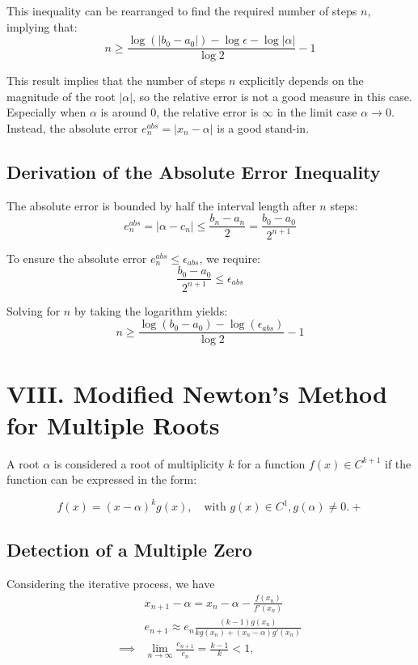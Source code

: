 \documentclass[a4paper]{article}
\begin{document}
This inequality can be rearranged to find the required number of steps $n$, implying that:
\[
n \geq \frac{\log(|b_0 - a_0|) - \log \epsilon - \log |\alpha|}{\log 2} - 1
\]

This result implies that the number of steps $n$ explicitly depends on the magnitude of the root $|\alpha|$, so the relative error is not a good measure in this case.
Especially when $\alpha$ is around $0$, the relative error is $\infty$ in the limit case $\alpha \to 0$.
Instead, the absolute error $e^{abs}_n = |x_n - \alpha|$ is a good stand-in.

\subsection*{Derivation of the Absolute Error Inequality}

The absolute error is bounded by half the interval length after $n$ steps:
\[
e^{abs}_n = |\alpha - c_n| \leq \frac{b_n - a_n}{2} = \frac{b_0 - a_0}{2^{n+1}}
\]

To ensure the absolute error $e^{abs}_n \le \epsilon_{abs}$, we require:
\[
\frac{b_0 - a_0}{2^{n+1}} \leq \epsilon_{abs}
\]

Solving for $n$ by taking the logarithm yields:
\[
n \geq \frac{\log(b_0 - a_0) - \log(\epsilon_{abs})}{\log 2} - 1
\]




\section*{VIII. Modified Newton's Method for Multiple Roots}
A root $\alpha$ is considered a root of multiplicity $k$ for a function $f(x) \in C^{k+1}$ if the function can be expressed in the form:

\begin{equation}
    f(x) = (x-\alpha)^k g(x), \quad \text{with } g(x) \in C^1, g(\alpha) \ne 0. \tag{14}+
\end{equation}
\subsection*{Detection of a Multiple Zero}
Considering the iterative process, we have
\begin{align}
  &x_{n+1} - \alpha = x_n - \alpha - \frac{f(x_n)}{f'(x_n)} \nonumber \\
  &e_{n+1} \approx e_n \frac{(k-1) g(x_n)}{k g(x_n) + (x_n - \alpha) g'(x_n)} \nonumber \\
  \implies &\lim_{n \to \infty} \frac{e_{n+1}}{e_n} = \frac{k-1}{k} < 1, \tag{15}
\end{align}
\end{document}
